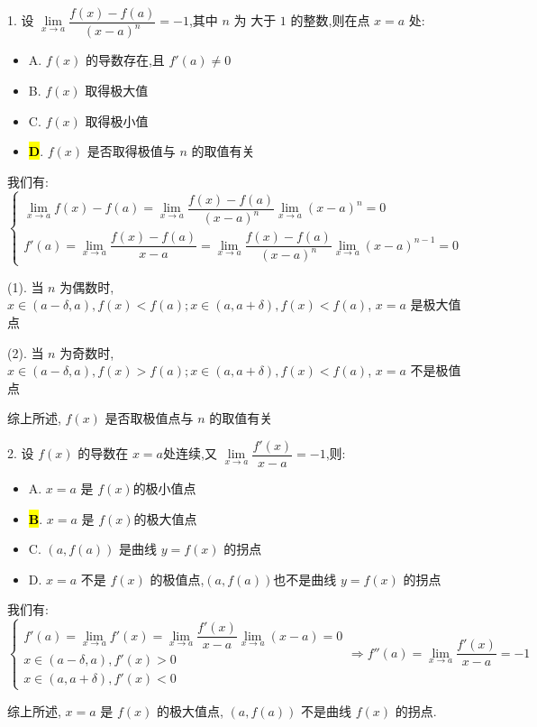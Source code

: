 1. 设 $\lim\limits_{x\to a}\dfrac{f(x)-f(a)}{(x-a)^{n}}=-1$,其中 $n$ 为 大于 $1$ 的整数,则在点 $x=a$ 处:
\begin{itemize}
	\item A. $f(x)$ 的导数存在,且 $f'(a)\neq 0$
	\item B. $f(x)$ 取得极大值
	\item C. $f(x)$ 取得极小值
	\item \hl{\textbf{D}}. $f(x)$ 是否取得极值与 $n$ 的取值有关
\end{itemize}
\begin{solution}

	我们有: $\begin{cases}
		\lim\limits_{x\to a} f(x)-f(a) = \lim\limits_{x\to a}\dfrac{f(x)-f(a)}{(x-a)^{n}}\lim\limits_{x\to a}(x-a)^{n} = 0\\
		f'(a) = \lim\limits_{x\to a}\dfrac{f(x)-f(a)}{x-a} =\lim\limits_{x\to a}\dfrac{f(x)-f(a)}{(x-a)^{n}}\lim\limits_{x\to a}(x-a)^{n-1} =0
	\end{cases}$

	(1). 当 $n$ 为偶数时, $x\in (a-\delta,a), f(x) < f(a); x\in (a,a+\delta), f(x) < f(a)$, $x=a$ 是极大值点

	(2). 当 $n$ 为奇数时, $x\in (a-\delta,a), f(x) > f(a); x\in (a,a+\delta), f(x) < f(a)$, $x=a$ 不是极值点

	综上所述, $f(x)$ 是否取极值点与 $n$ 的取值有关
\end{solution}

2. 设 $f(x)$ 的导数在 $x=a$处连续,又 $\lim\limits_{x\to a}\dfrac{f'(x)}{x-a}=-1$,则:
\begin{itemize}
	\item A. $x=a$ 是 $f(x)$的极小值点
	\item \hl{\textbf{B}}. $x=a$ 是 $f(x)$的极大值点
	\item C. $(a,f(a))$ 是曲线 $y=f(x)$ 的拐点
	\item D. $x=a$ 不是 $f(x)$ 的极值点,$(a,f(a))$也不是曲线 $y=f(x)$ 的拐点
\end{itemize}
\begin{solution}

	我们有: $$\begin{cases}
		f'(a) = \lim\limits_{x\to a} f'(x) = \lim\limits_{x\to a}\dfrac{f'(x)}{x-a}\lim\limits_{x\to a}(x-a) = 0\\
		x\in (a-\delta,a), f'(x) > 0\\
		x\in (a,a+\delta), f'(x) < 0
	\end{cases}\Rightarrow f''(a) = \lim\limits_{x\to a}\dfrac{f'(x)}{x-a} = -1$$

	综上所述, $x = a$ 是 $f(x)$ 的极大值点, $(a,f(a))$ 不是曲线 $f(x)$ 的拐点.
\end{solution}

